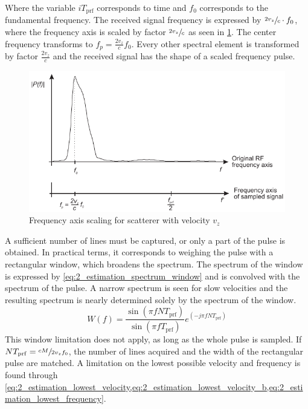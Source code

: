 Where the variable $iT_{\mathrm{prf}}$ corresponds to time and $f_{0}$ corresponds to the fundamental frequency. The received signal frequency is expressed by $\sfrac{2v_{z}}{c}\cdot f_{0}$, where the frequency axis is scaled by factor $\sfrac{2v_{z}}{c}$ as seen in \cref{fig:2_estimation_scaling_axis}. The center frequency transforms to $f_{p} = \frac{2v_{z}}{c} f_{0}$. Every other spectral element is transformed by factor $\frac{2v_{z}}{c}$ and the received signal has the shape of a scaled frequency pulse.
\begin{figure}[htbp]
	\centering
	\includegraphics[width=.8\textwidth]{Figures/2_estimation_frequency_scaling.pdf}
	\caption[Frequency axis scaling for scatterer with velocity $v_{z}$]{Frequency axis scaling for scatterer with velocity $v_{z}$ \cite{JensenUltrasoundBook}}
	\label{fig:2_estimation_scaling_axis}
\end{figure}
A sufficient number of lines must be captured, or only a part of the pulse is obtained. In practical terms, it corresponds to weighing the pulse with a rectangular window, which broadens the spectrum. The spectrum of the window is expressed by \cref{eq:2_estimation_spectrum_window} and is convolved with the spectrum of the pulse. A narrow spectrum is seen for slow velocities and the resulting spectrum is nearly determined solely by the spectrum of the window.
\begin{equation} \label{eq:2_estimation_spectrum_window}
	W(f) = \frac{\sin \left( \pi f N T_{\mathrm{prf}} \right) }{\sin \left( \pi f T_{\mathrm{prf}} \right)} e^{\left( -j\pi f N T_{\mathrm{prf}} \right)}
\end{equation}
This window limitation does not apply, as long as the whole pulse is sampled. If $NT_{\mathrm{prf}}=\sfrac{cM}{2v_{z}f_{0}}$, the number of lines acquired and the width of the rectangular pulse are matched. A limitation on the lowest possible velocity and frequency is found through \cref{eq:2_estimation_lowest_velocity,eq:2_estimation_lowest_velocity_b,eq:2_estimation_lowest_frequency}.
